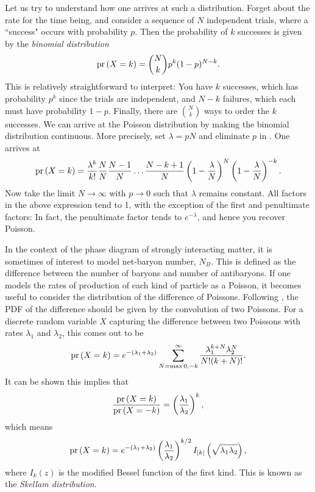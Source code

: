 Let us try to understand how one arrives at such a distribution.
Forget about the rate for the time being, and consider a sequence of 
$N$ independent trials, where a ``success" occurs with probability $p$.
Then the probability of $k$ successes is given by the {\it binomial
distribution}
\begin{equation}\label{eq:binomial}
\pr{X=k}=\binom{N}{k}p^k(1-p)^{N-k}.
\end{equation}
This is relatively straightforward to interpret: You have $k$ successes,
which has probability $p^k$ since the trials are independent, and $N-k$
failures, which each must have probability $1-p$. Finally, there are
$\binom{N}{k}$ ways to order the $k$ successes. We can arrive at the Poisson
distribution by making the binomial distribution continuous.
More precisely, set $\lambda=pN$ and eliminate $p$ in .
One arrives at
\begin{equation}
\pr{X=k}=\frac{\lambda^k}{k!}\frac{N}{N}\frac{N-1}{N}\dots
\frac{N-k+1}{N}\left(1-\frac{\lambda}{N}\right)^N
\left(1-\frac{\lambda}{N}\right)^{-k}.
\end{equation}
Now take the limit $N\to\infty$ with $p\to0$ such that $\lambda$ remains
constant. All factors in the above expression tend to 1, with the
exception of the first and penultimate factors: In fact, the penultimate
factor tends to $e^{-\lambda}$, and hence you recover Poisson.

In the context of the phase diagram of strongly interacting matter, it is
sometimes of interest to model net-baryon number, $N_B$.
This is defined as the difference between the number of baryons and number 
of antibaryons. If one models the rates of production of each kind of particle
as a Poisson, it becomes useful to consider the distribution of the difference
of Poissons. Following , the PDF of the difference should
be given by the convolution of two Poissons. For a discrete random variable $X$
capturing the difference between two Poissons with rates $\lambda_1$ and
$\lambda_2$, this comes out to be
\begin{equation}
\pr{X=k}=e^{-(\lambda_1+\lambda_2)}
\sum_{N=\max{0,-k}}^\infty \frac{\lambda_1^{k+N}\lambda_2^N}{N!(k+N)!}.
\end{equation} 
It can be shown this implies that
\begin{equation}
\frac{\pr{X=k}}{\pr{X=-k}}=
\left(\frac{\lambda_1}{\lambda_2}\right)^k,
\end{equation} 
which means
\begin{equation}
\pr{X=k}=e^{-(\lambda_1+\lambda_2)}
\left(\frac{\lambda_1}{\lambda_2}\right)^{k/2}I_{|k|}\left(\sqrt{\lambda_1\lambda_2}\right),
\end{equation} 
where $I_k(z)$ is the modified Bessel function of the first kind.
This is known as the {\it Skellam distribution}.

